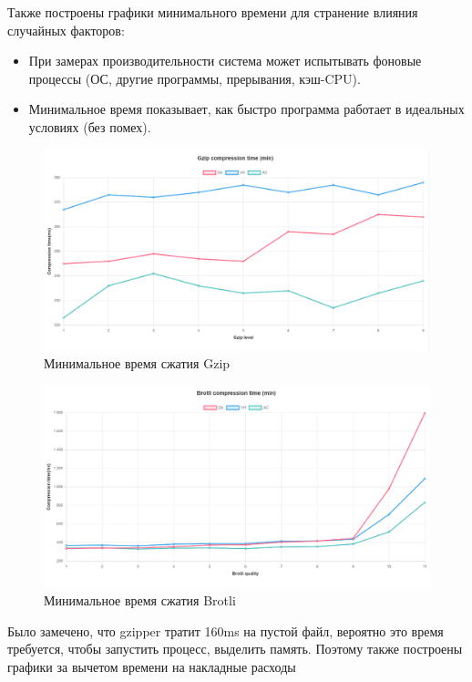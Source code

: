 \documentclass[12pt]{article}
\begin{document}
Также построены графики минимального времени для странение влияния случайных факторов:

\begin{itemize}
    \item При замерах производительности система может испытывать фоновые процессы (ОС, другие программы, прерывания, кэш-CPU).
    \item Минимальное время показывает, как быстро программа работает в идеальных условиях (без помех).
\end{itemize}

\begin{figure}[H]
    \centering
    \includegraphics[width=1\textwidth]{../images/Gzip compression time (min).png}
    \caption{Минимальное время сжатия Gzip}
\end{figure}

\begin{figure}[H]
    \centering
    \includegraphics[width=1\textwidth]{../images/Brotli compression time (min).png}
    \caption{Минимальное время сжатия Brotli}
\end{figure}

Было замечено, что gzipper тратит 160ms на пустой файл, вероятно это время требуется, чтобы запустить процесс, выделить память. Поэтому также построены графики за вычетом времени на накладные расходы
\end{document}
